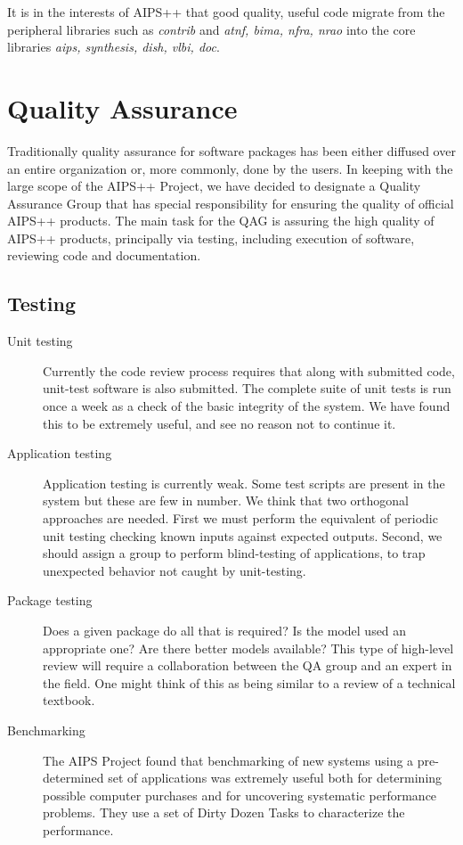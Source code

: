 It is in the interests of AIPS++ that good quality, useful code
migrate from the peripheral libraries such as {\em contrib} and {\em
atnf, bima, nfra, nrao} into the core libraries {\em aips, synthesis,
dish, vlbi, doc}. 

\section{Quality Assurance}

Traditionally quality assurance for software packages has been either
diffused over an entire organization or, more commonly, done by the
users. In keeping with the large scope of the AIPS++ Project, we have
decided to designate a Quality Assurance Group that has special
responsibility for ensuring the quality of official AIPS++
products. The main task for the QAG is assuring the high quality of
AIPS++ products, principally via testing, including execution of
software, reviewing code and documentation.

\subsection{Testing}
\begin{description}
\item[Unit testing] Currently the code review process requires that
along with submitted code, unit-test software is also submitted.
The complete suite of unit tests is run once a week
as a check of the basic integrity of the system. We have found this 
to be extremely useful, and see no reason not to continue it.
\item[Application testing] Application testing is currently
weak. Some test scripts are present in the system but these are few in
number. We think that two orthogonal approaches are needed. First we
must perform the equivalent of periodic unit testing checking
known inputs against expected outputs. Second, we
should assign a group to perform blind-testing of applications,
to trap unexpected behavior not caught by unit-testing.
\item[Package testing] Does a given package do all that is
required? Is the model used an appropriate one? Are there
better models available? This type of high-level review will
require a collaboration between the QA group and an expert in
the field. One might think of this as being similar to a review
of a technical textbook.
\item[Benchmarking] The AIPS Project found that benchmarking of
new systems using a pre-determined set of applications was
extremely useful both for determining possible computer purchases
and for uncovering systematic performance problems. They use a 
set of Dirty Dozen Tasks to characterize the performance.
\end{description}

